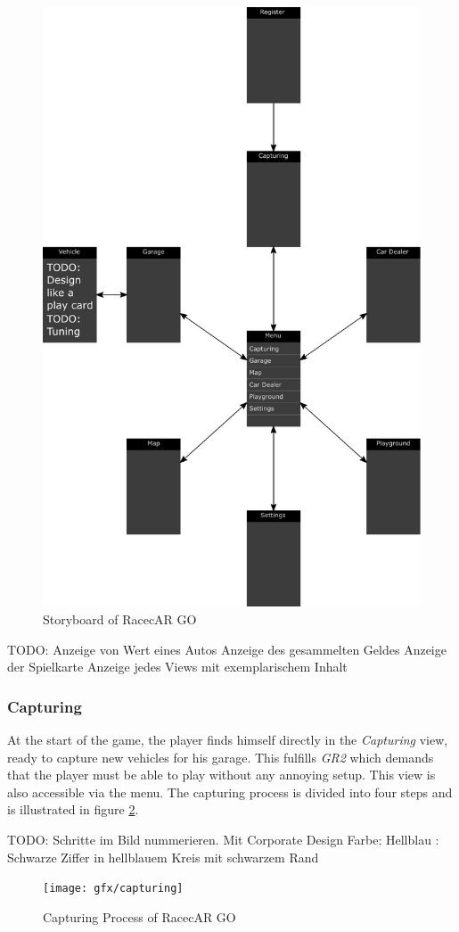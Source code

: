 \begin{figure}[btph]
  \centering
        \includegraphics[width=.75\linewidth]{gfx/storyboard}
        \caption{Storyboard of RacecAR GO}
        \label{fig:storyboard}
\end{figure}
TODO:
Anzeige von Wert eines Autos
Anzeige des gesammelten Geldes
Anzeige der Spielkarte
Anzeige jedes Views mit exemplarischem Inhalt

\subsubsection{Capturing}
At the start of the game, the player finds himself directly in the \emph{Capturing} view, ready to capture new vehicles for his garage. This fulfills \emph{GR2} which demands that the player must be able to play without any annoying setup. This view is also accessible via the menu. The capturing process is divided into four steps and is illustrated in figure \ref{fig:capturing}.

TODO: Schritte im Bild nummerieren. Mit Corporate Design Farbe: Hellblau : Schwarze Ziffer in hellblauem Kreis mit schwarzem Rand
\begin{figure}[btph]
  \centering
        \texttt{[image: gfx/capturing]}
        \caption{Capturing Process of RacecAR GO}
        \label{fig:capturing}
\end{figure}

